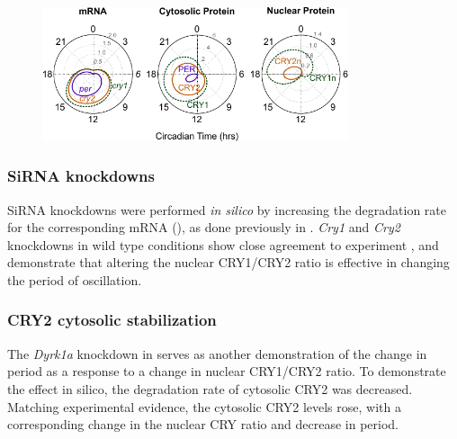 \begin{figure}[bt]
  \centering
  \includegraphics[width=0.8\textwidth]{chap2/figures/timecourse.pdf}
  \label{fig:timecourse}
\end{figure}

\subsubsection{SiRNA knockdowns}
SiRNA knockdowns were performed {\it in silico} by increasing the degradation rate for the corresponding mRNA (), as done previously in \cite{Relogio2011}. 
{\it Cry1} and {\it Cry2} knockdowns in wild type conditions show close agreement to experiment \cite{Zhang2009}, and demonstrate that altering the nuclear CRY1/CRY2 ratio is effective in changing the period of oscillation.

\subsubsection{CRY2 cytosolic stabilization}
The {\it Dyrk1a} knockdown in \cite{Kurabayashi2010} serves as another demonstration of the change in period as a response to a change in nuclear CRY1/CRY2 ratio. 
To demonstrate the effect in silico, the degradation rate of cytosolic CRY2 was decreased. 
Matching experimental evidence, the cytosolic CRY2 levels rose, with a corresponding change in the nuclear CRY ratio and decrease in period.

